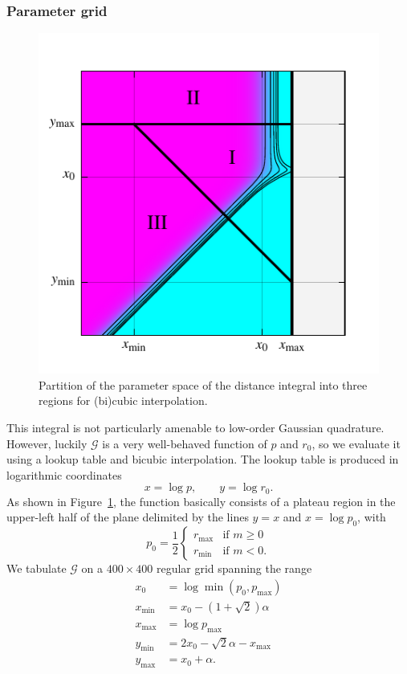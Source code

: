 \documentclass[amsmath,amssymb,aps,prx,reprint,nopreprintnumbers,nofootinbib,showpacs]{revtex4-1}
\begin{document}
\subsubsection{Parameter grid}

\begin{figure}
    \includegraphics{radial_integral_interpolant}
    \caption{\label{fig:radial-integral-interpolant}Partition of the parameter space of the distance integral into three regions for (bi)cubic interpolation.}
\end{figure}

This integral is not particularly amenable to low-order Gaussian quadrature. However, luckily $\mathscr{G}$ is a very well-behaved function of $p$ and $r_0$, so we evaluate it using a lookup table and bicubic interpolation. The lookup table is produced in logarithmic coordinates
%
\begin{equation}
    x = \log p, \qquad y = \log r_0.
\end{equation}
%
As shown in Figure~\ref{fig:radial-integral-interpolant}, the function basically consists of a plateau region in the upper-left half of the plane delimited by the lines $y = x$ and $x = \log p_0$, with
%
\begin{equation}
    p_0 = \frac{1}{2}
    \begin{cases}
        r_\mathrm{max} & \text{if } m \geq 0 \\
        r_\mathrm{min} & \text{if } m < 0.
    \end{cases}
\end{equation}
%
We tabulate $\mathscr{G}$ on a $400 \times 400$ regular grid spanning the range
%
\begin{align}
    x_0 &= \log \min(p_0, p_\mathrm{max}) \\
    x_\mathrm{min} &= x_0 - (1 + \sqrt{2}) \alpha \\
    x_\mathrm{max} &= \log p_\mathrm{max} \\
    y_\mathrm{min} &= 2 x_0 - \sqrt{2} \alpha - x_\mathrm{max} \\
    y_\mathrm{max} &= x_0 + \alpha.
\end{align}
\end{document}
